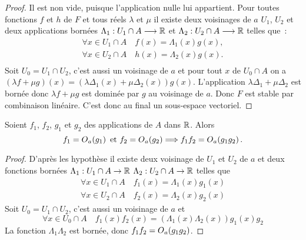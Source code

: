 \begin{proof}
  Il est non vide, puisque l'application nulle lui appartient. Pour toutes
  fonctions \(f\) et \(h\) de \(F\) et tous réels \(\lambda\) et \(\mu\) il
  existe deux voisinages de \(a\) \(U_1\), \(U_2\) et deux  applications bornées
  \(\Lambda_1:U_1 \cap A \longrightarrow \mathbb{R}\) et \(\Lambda_2:U_2 \cap A
  \longrightarrow \mathbb{R}\)  telles que~:
  \begin{gather}
    \forall x \in U_1\cap A \quad f(x)=\Lambda_1(x)g(x),\\
    \forall x \in U_2\cap A \quad h(x)=\Lambda_2(x)g(x).\\
  \end{gather}
  Soit \(U_0=U_1 \cap U_2\), c'est aussi un voisinage de \(a\) et pour tout
  \(x\) de \(U_0 \cap A\) on a \((\lambda f +\mu
  g)(x)=(\lambda\Delta_1(x)+\mu\Delta_2(x))g(x)\). L'application
  \(\lambda\Delta_1+\mu\Delta_2\) est bornée donc \(\lambda f + \mu g\) est
  dominée par \(g\) au voisinage de \(a\). Donc \(F\) est stable par combinaison
  linéaire. C'est donc au final un sous-espace vectoriel.
\end{proof}
\begin{prop}
  Soient \(f_1\), \(f_2\), \(g_1\) et \(g_2\) des applications de \(A\) dans
  \(\mathbb{R}\). Alors
  \begin{equation}
    f_1=O\mathopen{}_{a}\left(g_1\right) \text{~et~} f_2=O\mathopen{}_{a}\left(g_2\right) \Longrightarrow f_1f_2
    = O\mathopen{}_{a}\left(g_1g_2\right).
  \end{equation}
\end{prop}
\begin{proof}
  D'après les hypothèse il existe deux voisinage de \(U_1\) et \(U_2\) de \(a\)
  et deux fonctions bornées \(\Lambda_1:U_1 \cap A \rightarrow \mathbb{R}\)
  \(\Lambda_2:U_2 \cap A \rightarrow \mathbb{R}\) telles que
  \begin{align}
    \forall x \in U_1\cap A \quad f_1(x)=\Lambda_1(x)g_1(x)\\
    \forall x \in U_2\cap A \quad f_2(x)=\Lambda_2(x)g_2(x)
  \end{align}
  Soit \(U_0=U_1 \cap U_2\), c'est aussi un voisinage de \(a\) et
  \begin{equation}
    \forall x \in U_0 \cap A \quad f_1(x)f_2(x) = (\Lambda_1(x) \Lambda_2(x))
    g_1(x)g_2
  \end{equation}
  La fonction \(\Lambda_1 \Lambda_2\) est bornée, donc \(f_1f_2 =
  O\mathopen{}_{a}\left(g_1g_2\right)\).
\end{proof}

